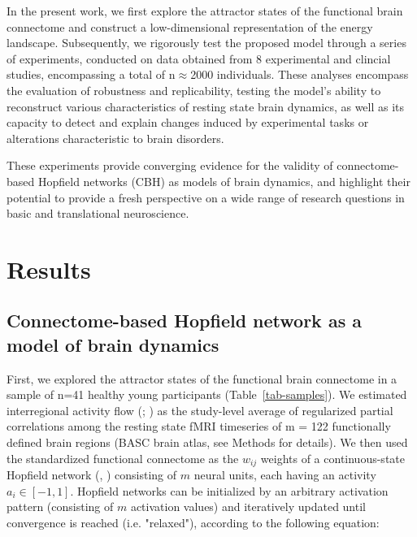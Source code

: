 \documentclass{article}
\begin{document}
In the present work, we first explore the attractor states of the functional brain connectome and construct a
low-dimensional representation of the energy landscape.
Subsequently, we rigorously test the proposed model through a series of experiments, conducted on data obtained
from 8 experimental and clincial studies, encompassing a total of n$\approx$2000 individuals.
These analyses encompass the evaluation of robustness and replicability, testing the model's ability to reconstruct
various characteristics of resting state brain dynamics, as well as its capacity to detect and explain changes induced
by experimental tasks or alterations characteristic to brain disorders.

These experiments provide converging evidence for the validity of connectome-based Hopfield networks (CBH) as models
of brain dynamics, and highlight their potential to provide a fresh perspective on a wide range of research questions
in basic and translational neuroscience.

\section{Results}\label{Results}

\subsection{Connectome-based Hopfield network as a model of brain dynamics}\label{Connectome-based Hopfield network as a model of brain dynamics}

First, we explored the attractor states of the functional brain connectome in a sample of n=41 healthy young participants (Table~\ref{tab-samples}).
We estimated interregional activity flow (\href{https://doi.org/10.1038/nn.4406}{}; \href{https://doi.org/10.1038/s41467-017-01000-w}{}) as the study-level average of regularized partial correlations among the resting state fMRI timeseries of m = 122 functionally defined brain regions (BASC brain atlas, see Methods for details).
We then used the standardized functional connectome as the $w_{ij}$  weights of a continuous-state Hopfield network (\href{https://doi.org/10.1073/pnas.79.8.2554}{}, \href{https://doi.org/10.1162/neco.1994.6.3.459}{}) consisting of $m$ neural units, each having an activity $a_i \in [ -1,1]$.
Hopfield networks can be initialized by an arbitrary activation pattern (consisting of $m$ activation values) and iteratively updated until convergence is reached (i.e. "relaxed"), according to the following equation:
\end{document}
